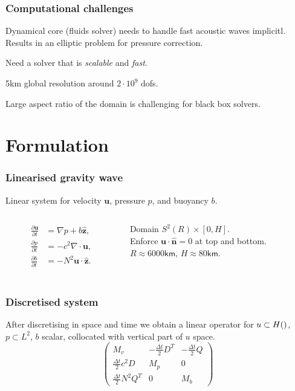 \documentclass[presentation]{beamer}
\renewcommand{\vec}[1]{\ensuremath{\boldsymbol{#1}}}
\newcommand{\ddt}[1]{\frac{\partial #1}{\partial t}}
\newcommand{\zhat}{\hat{\vec{z}}}
\let\div\relax
\DeclareMathOperator{\div}{div}
\begin{document}
\begin{frame}
  \frametitle{Computational challenges}
  Dynamical core (fluids solver) needs to handle fast acoustic waves
  implicitl.  Results in an elliptic problem for pressure correction.

  Need a solver that is \emph{scalable} and \emph{fast}.

  5km global resolution around $2 \cdot 10^9$ dofs.

  Large aspect ratio of the domain is challenging for black box solvers.
\end{frame}

\section{Formulation}

\begin{frame}
  \frametitle{Linearised gravity wave}
  Linear system for velocity $\vec{u}$, pressure $p$, and buoyancy $b$.
  \begin{columns}
    \begin{column}{0.4\textwidth}
      \begin{align*}
        \ddt{\vec{u}} &= \nabla p + b \zhat, \\
        \ddt{p} &= -c^2 \nabla\cdot \vec{u}, \\
        \ddt{b} &= -N^2\vec{u}\cdot\zhat.\\
      \end{align*}
    \end{column}
    \begin{column}{0.6\textwidth}
      Domain $S^2(R) \times [0, H]$.\\
      Enforce $\vec{u}\cdot \hat{\vec{n}} = 0$ at top and bottom.\\
      $R\approx 6000\textsf{km}$, $H\approx 80\textsf{km}$.
    \end{column}
  \end{columns}
\end{frame}

\begin{frame}
  \frametitle{Discretised system}
  After discretising in space and time we obtain a linear operator for
  $u \subset H(\div)$, $p \subset L^2$, $b$ scalar, collocated with
  vertical part of $u$ space.
\begin{equation*}
\begin{pmatrix}
  M_v & 
    -\frac{\Delta t}{2}D^T & 
    -\frac{\Delta t}{2}Q\\[1ex]
  \frac{\Delta t}{2}c^2D & M_p & 0\\[1ex]
  \frac{\Delta t}{2}N^2Q^T & 0 & M_b
\end{pmatrix}
\end{equation*}
\end{frame}
\end{document}

